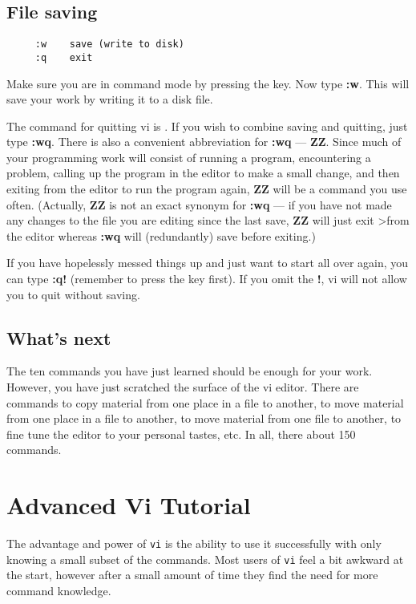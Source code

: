 \subsection{File saving}
\begin{verbatim}
     :w    save (write to disk)
     :q    exit 
\end{verbatim}

Make sure you are in command mode by pressing the  key. Now
type {\bf :w}. This will save your work by writing it to a disk file.

The command for quitting vi is . If you wish to combine saving 
and quitting, just type {\bf :wq}. There is also a convenient abbreviation 
for {\bf :wq} --- {\bf ZZ}. Since much of your programming work will consist of 
running a program, encountering a problem, calling up the program in 
the editor to make a small change, and then exiting from the editor to 
run the program again, {\bf ZZ} will be a command you use often. 
(Actually, {\bf ZZ} is not an exact synonym for {\bf :wq} --- if you have not 
made any changes
to the file you are editing since the last save, {\bf ZZ} will just exit
>from the editor whereas {\bf :wq} will (redundantly) save before exiting.)

If you have hopelessly messed things up and just want to start 
all over again, you can type {\bf :q!} (remember to press the  
key first). If you omit the {\bf !}, vi will not allow you to quit 
without saving.

\subsection{What's next}

The ten commands you have just learned should be enough for your 
work. However, you have just scratched the surface of 
the vi editor. There are commands to copy material from 
one place in a file to another, to move material from one place 
in a file to another, to move material from one file to another, 
to fine tune the editor to your personal tastes, etc. In all, 
there about 150 commands.

\section{Advanced Vi Tutorial}
The advantage and power of {\tt vi} is the ability to use it successfully
with only knowing a small subset of the commands. Most users of {\tt vi}
feel a bit awkward at the start, however after a small amount of time they find
the need for more command knowledge.

